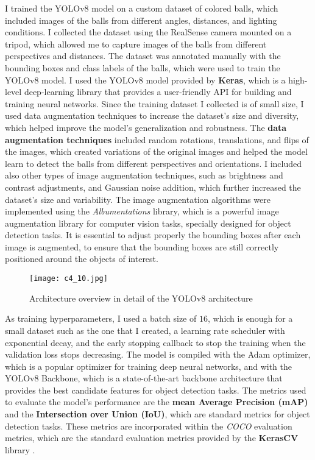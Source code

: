 I trained the YOLOv8 model on a custom dataset of colored balls, which included images of the balls
from different angles, distances, and lighting conditions. I collected the dataset using the RealSense camera mounted
on a tripod, which allowed me to capture images of the balls from different perspectives and distances. The dataset
was annotated manually with the bounding boxes and class labels of the balls, which were used to train the YOLOv8 model.
I used the YOLOv8 model provided by \textbf{Keras}, which is a high-level deep-learning library that provides a user-friendly
API for building and training neural networks. Since the training dataset I collected is of small size,
I used data augmentation techniques to increase the dataset's size and diversity, which helped improve the model's
generalization and robustness. The \textbf{data augmentation techniques} included random rotations, translations, and flips
of the images, which created variations of the original images and helped the model learn to detect the balls
from different perspectives and orientations. I included also other types of image augmentation techniques, such as
brightness and contrast adjustments, and Gaussian noise addition, which further increased the dataset's
size and variability. The image augmentation algorithms were implemented using the \textit{Albumentations} library,
which is a powerful image augmentation library for computer vision tasks, specially designed for 
object detection tasks. It is essential to adjust properly the bounding boxes after each image
is augmented, to ensure that the bounding boxes are still correctly positioned around the objects of interest.

\begin{figure}[t]
    \centering
    \texttt{[image: c4\_10.jpg]}
    \caption{Architecture overview in detail of the YOLOv8 architecture}
    \label{fig:yolov8}
\end{figure}

As training hyperparameters, I used a batch size of $16$, which is enough for a small dataset such as the one
that I created, a learning rate scheduler with exponential decay, and the early stopping callback to stop the training
when the validation loss stops decreasing. The model is compiled with the Adam optimizer, which is a popular optimizer
for training deep neural networks, and with the YOLOv8 Backbone, which is a state-of-the-art backbone architecture
that provides the best candidate features for object detection tasks. The metrics used to evaluate the model's performance
are the \textbf{mean Average Precision (mAP)} and the \textbf{Intersection over Union (IoU)},
which are standard metrics for object detection tasks. These metrics are incorporated within the \textit{COCO} evaluation metrics,
which are the standard evaluation metrics provided by the \textbf{KerasCV} library \cite{wood2022kerascv}.

